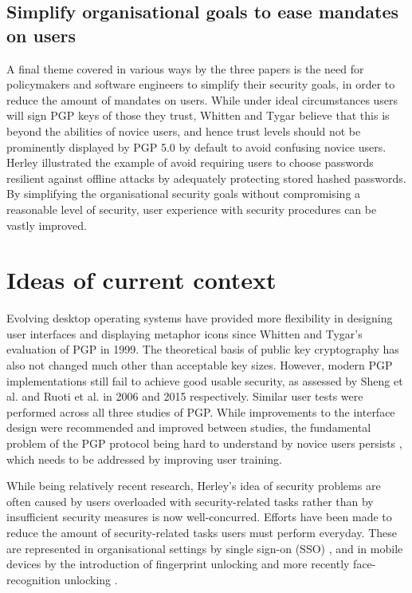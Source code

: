 \documentclass[11pt]{article}
\begin{document}
\subsection{Simplify organisational goals to ease mandates on users}

A final theme covered in various ways by the three papers is the need for policymakers and software engineers to simplify their security goals, in order to reduce the amount of mandates on users. While under ideal circumstances users will sign PGP keys of those they trust, Whitten and Tygar \cite[4.4]{whitten1999johnny} believe that this is beyond the abilities of novice users, and hence trust levels should not be prominently displayed by PGP 5.0 by default to avoid confusing novice users. Herley \cite[2.4]{herley2014more} illustrated the example of avoid requiring users to choose passwords resilient against offline attacks by adequately protecting stored hashed passwords. By simplifying the organisational security goals without compromising a reasonable level of security, user experience with security procedures can be vastly improved.  

\section{Ideas of current context}

Evolving desktop operating systems have provided more flexibility in designing user interfaces and displaying metaphor icons \cite[4.1]{whitten1999johnny} since Whitten and Tygar's \cite{whitten1999johnny} evaluation of PGP in 1999. The theoretical basis of public key cryptography has also not changed much other than acceptable key sizes. However, modern PGP implementations still fail to achieve good usable security, as assessed by Sheng et al. \cite{sheng2006johnny} and Ruoti et al. \cite{ruoti2015johnny} in 2006 and 2015 respectively. Similar user tests were performed across all three studies of PGP. While improvements to the interface design were recommended and improved between studies, the fundamental problem of the PGP protocol being hard to understand by novice users persists \cite[p. 4]{ruoti2015johnny}, which needs to be addressed by improving user training.

While being relatively recent research, Herley's \cite{herley2014more} idea of security problems are often caused by users overloaded with security-related tasks rather than by insufficient security measures is now well-concurred. Efforts have been made to reduce the amount of security-related tasks users must perform everyday. These are represented in organisational settings by single sign-on (SSO) \cite[8.1]{sasse2014great}, and in mobile devices by the introduction of fingerprint unlocking \cite{cherapau2015impact} and more recently face-recognition unlocking \cite{applefaceid}.
\end{document}
